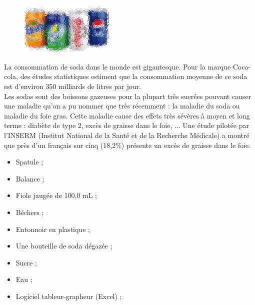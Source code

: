 
\begin{tcolorbox}[colback=orange!5!white,colframe=orange!75!black,title= Scénario:]
\begin{figure}
\vspace{-0.6cm}
    \centering
      \includegraphics[width=0.4\textwidth]{Images/TP/TP6/Soda_flou.png}
  \end{figure}
La consommation de soda dans le monde est gigantesque. Pour la marque Coca-cola, des études statistiques estiment que la consommation moyenne de ce soda est d'environ 350 milliards de litres par jour.\\
Les sodas sont des boissons gazeuses pour la plupart très sucrées pouvant causer une maladie qu'on a pu nommer que très récemment : la maladie du soda ou maladie du foie gras. Cette maladie cause des effets très sévères à moyen et long terme : diabète de type 2, excès de graisse dans le foie, ... Une étude pilotée par l'INSERM (Institut National de la Santé et de la Recherche Médicale) a montré que près d’un français sur cinq (18,2\%) présente un excès de graisse dans le foie.

\end{tcolorbox}
\newpage

\begin{mdframed}[style=autreexo]
\textbf{}
\begin{itemize}
    \item Spatule ;
    \item Balance ;
    \item Fiole jaugée de 100,0 mL ;
    \item Béchers ;
    \item Entonnoir en plastique ;
    \item Une bouteille de soda dégazée ;
    \item Sucre ;
    \item Eau ;
    \item Logiciel tableur-grapheur (Excel) ; 
\end{itemize}
\end{mdframed}

